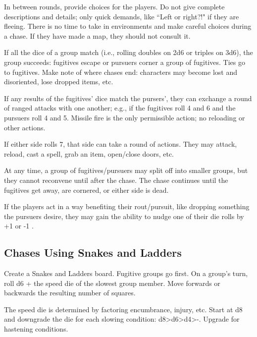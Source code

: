 \documentclass[twoside]{article}
\begin{document}
\bigbreak

In between rounds, provide choices for the players. Do not give complete descriptions and details; only quick demands, like ``Left or right?!" if they are fleeing. There is no time to take in environments and make careful choices during a chase. If they have made a map, they should not consult it.

\bigbreak

If all the dice of a group match (i.e., rolling doubles on 2d6 or triples on 3d6), the group succeeds: fugitives escape or pursuers corner a group of fugitives. Ties go to fugitives. Make note of where chases end: characters may become lost and disoriented, lose dropped items, etc. 

\bigbreak

If any results of the fugitives' dice match the pursers', they can exchange a round of ranged attacks with one another; e.g., if the fugitives roll 4 and 6 and the pursuers roll 4 and 5. Missile fire is the only permissible action; no reloading or other actions.

\bigbreak

If either side rolls 7, that side can take a round of actions. They may attack, reload, cast a spell, grab an item, open/close doors, etc.

\bigbreak

At any time, a group of fugitives/pursuers may split off into smaller groups, but they cannot reconvene until after the chase. The chase continues until the fugitives get away, are cornered, or either side is dead.

\bigbreak

If the players act in a way benefiting their rout/pursuit, like dropping something the pursuers desire, they may gain the ability to nudge one of their die rolls by +1 or -1 .

\subsection*{Chases Using Snakes and Ladders}

Create a Snakes and Ladders board. Fugitive groups go first. On a group's turn, roll d6 + the speed die of the slowest group member. Move forwards or backwards the resulting number of squares.

\bigbreak

The speed die is determined by factoring encumbrance, injury, etc. Start at d8 and downgrade the die for each slowing condition: d8>d6>d4>-. Upgrade for hastening conditions.
\end{document}
